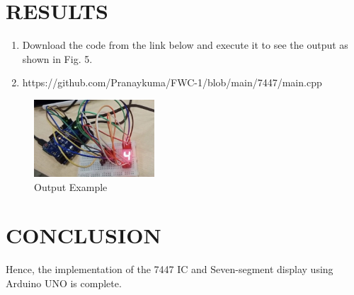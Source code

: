 \documentclass[conference]{IEEEtran}
\begin{document}
\section{RESULTS}
\begin{enumerate}
\item Download the code from the link below and execute it to see the output as shown in Fig. 5.
\item https://github.com/Pranaykuma/FWC-1/blob/main/7447/main.cpp
\end{enumerate}

\begin{figure}[htbp] 
\centering 
\includegraphics[width=0.4\textwidth]{744706.jpg}
\caption{\label{fig:Gates} Output Example}    
\end{figure}

\section{CONCLUSION}
Hence, the implementation of the 7447 IC and Seven-segment display using Arduino UNO is complete.
\end{document}
